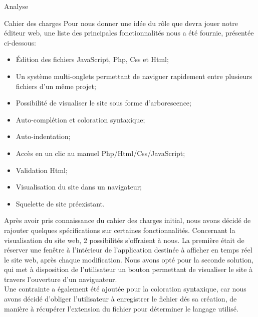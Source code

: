 \documentclass[a4paper, 12pt]{report}
\begin{document}
	\begin{part}{Analyse}
		\begin{chapter}{Cahier des charges}
		Pour nous donner une idée du rôle que devra jouer notre éditeur web, une liste des principales fonctionnalités nous a été fournie,
		présentée ci-dessous:\\
				\begin{itemize}
					\item Édition des fichiers JavaScript, Php, Css et Html;
					\item Un système multi-onglets permettant de naviguer rapidement entre plusieurs fichiers d'un même projet;
					\item Possibilité de visualiser le site sous forme d'arborescence;
					\item Auto-complétion et coloration syntaxique;
					\item Auto-indentation;
					\item Accès en un clic au manuel Php/Html/Css/JavaScript;
					\item Validation Html;
					\item Visualisation du site dans un navigateur;
					\item Squelette de site préexistant.
				\end{itemize}
		

		Après avoir pris connaissance du cahier des charges initial, nous avons décidé de rajouter quelques spécifications sur certaines 
		fonctionnalités. Concernant la visualisation du site web, 2 possibilités s'offraient à nous. La première était de réserver une fenêtre à 
		l'intérieur de l'application destinée à afficher en temps réel le site web, après chaque modification.
		Nous avons opté pour la seconde solution, qui met à disposition de l'utilisateur un bouton permettant de visualiser le site à 
		travers l'ouverture d'un naviguateur.\\
		Une contrainte a également été ajoutée pour la coloration syntaxique, car nous avons décidé d'obliger l'utilisateur à enregistrer le 
		fichier dés sa création, de manière à récupérer l'extension du fichier pour déterminer le langage utilisé.\\
		

\end{chapter}
\end{part}
\end{document}
